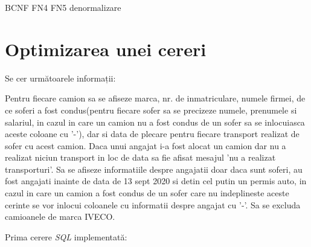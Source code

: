 \documentclass[12pt, a4paper]{article}
\begin{document}
\begin{table}[!htbp]
\begin{center}
\caption{Proiectia \emph{R1-3($X_2$, $X_3$)}}\label{tab11-3}
\end{center}
\end{table}

\newpage
BCNF
FN4
FN5
denormalizare
\newpage

\newpage
\section{Optimizarea unei cereri}

Se cer următoarele informații:

Pentru fiecare camion sa se afiseze marca, nr. de inmatriculare, numele firmei, de ce soferi a fost condus(pentru fiecare sofer sa se precizeze numele, prenumele si salariul, in cazul in care un camion nu a fost condus de un sofer sa se inlocuiasca aceste coloane cu '-'), dar si data de plecare pentru fiecare transport realizat de sofer cu acest camion. Daca unui angajat i-a fost alocat un camion dar nu a realizat niciun transport in loc de data sa fie afisat mesajul 'nu a realizat transporturi'. Sa se afiseze informatiile despre angajatii doar daca sunt soferi, au fost angajati inainte de data de 13 sept 2020 si detin cel putin un permis auto, in cazul in care un camion a fost condus de un sofer care nu indeplineste aceste cerinte se vor inlocui coloanele cu informatii despre angajat cu '-'. Sa se excluda camioanele de marca IVECO.

Prima cerere \emph{SQL} implementată:
\end{document}
